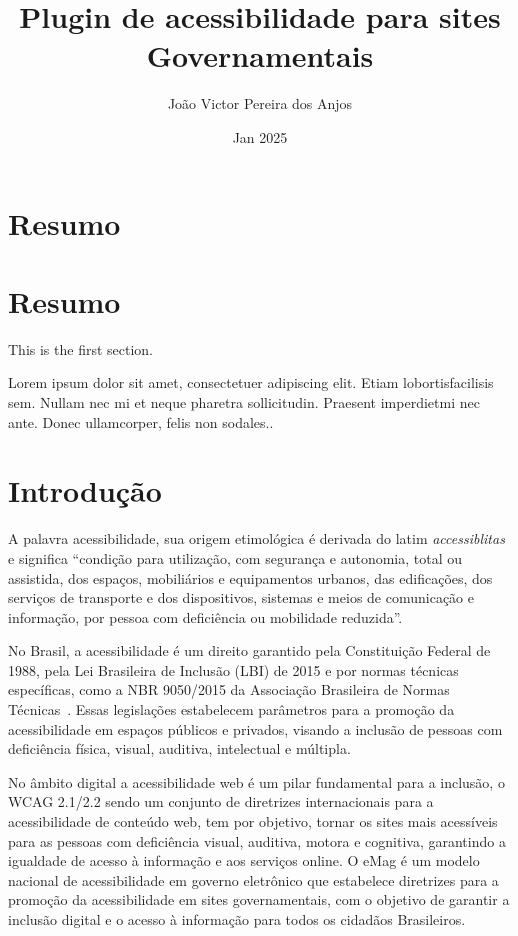 \documentclass[12pt]{article}
\title{Plugin de acessibilidade para sites Governamentais}
\author{João Victor Pereira dos Anjos}
\date{Jan 2025}
\begin{document}
\maketitle
  
\tableofcontents

\section{Resumo}

\section{Resumo}
   
This is the first section.
      
Lorem  ipsum  dolor  sit  amet,  consectetuer  adipiscing  
elit.   Etiam  lobortisfacilisis sem.  Nullam nec mi et 
neque pharetra sollicitudin.  Praesent imperdietmi nec ante. 
Donec ullamcorper, felis non sodales..

\section{Introdução}

A palavra acessibilidade, sua origem etimológica é derivada do latim \textit{accessiblitas} 
e significa ``condição para utilização, com segurança e autonomia, 
total ou assistida, dos espaços, mobiliários e equipamentos urbanos, das 
edificações, dos serviços de transporte e dos dispositivos, sistemas e meios de
comunicação e informação, por pessoa com deficiência ou mobilidade reduzida''\cite{Acessibilidade}.

No Brasil, a acessibilidade é um direito garantido pela Constituição 
Federal de 1988, pela Lei Brasileira de Inclusão (LBI) de 2015 \Cite{LBI}
e por normas técnicas específicas, como a NBR 9050/2015 da Associação 
Brasileira de Normas Técnicas~\cite{ABNT}. Essas legislações estabelecem 
parâmetros para a promoção da acessibilidade em espaços públicos e privados,
visando a inclusão de pessoas com deficiência física, visual, auditiva, 
intelectual e múltipla.

No âmbito digital a acessibilidade web é um pilar fundamental para a 
inclusão, o WCAG 2.1/2.2 \autocite{wcag22} sendo um conjunto de diretrizes
internacionais para a acessibilidade de conteúdo web, tem por objetivo, 
tornar os sites mais acessíveis para as pessoas com deficiência visual, auditiva,
motora e cognitiva, garantindo a igualdade de acesso à informação e aos 
serviços online. O eMag é um modelo nacional de acessibilidade em governo 
eletrônico que estabelece diretrizes para a promoção da acessibilidade em 
sites governamentais, com o objetivo de garantir a inclusão digital e o acesso 
à informação para todos os cidadãos Brasileiros.
\end{document}
